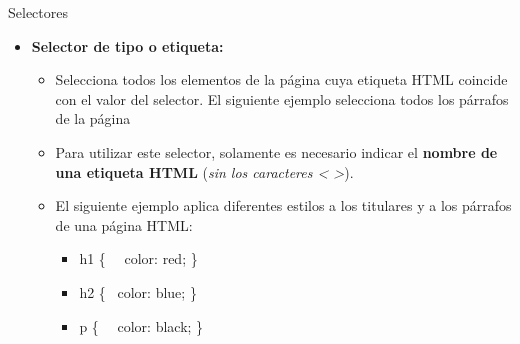 \documentclass[aspectratio=43,10pt,t]{beamer}
\begin{document}
\begin{frame}{Selectores}\relax
\begingroup
{}
\begin{itemize}
  \item\relax \textbf{Selector de tipo o etiqueta:}
  \begin{itemize}
    \item\relax Selecciona todos los elementos de la página cuya etiqueta HTML coincide con el valor del selector. El siguiente ejemplo selecciona todos los párrafos de la página
    \item\relax Para utilizar este selector, solamente es necesario indicar el \textbf{nombre de una etiqueta HTML} (\textit{sin los caracteres < >}).
    \item\relax El siguiente ejemplo aplica diferentes estilos a los titulares y a los párrafos de una página HTML:
    \begin{itemize}
      \item\relax h1 \{ ~~color: red; \}
      \item\relax h2 \{ ~color: blue; \}
      \item\relax  p \{ ~~color: black; \}
    \end{itemize}
  \end{itemize}
\end{itemize}
\endgroup
\end{frame}
\end{document}
